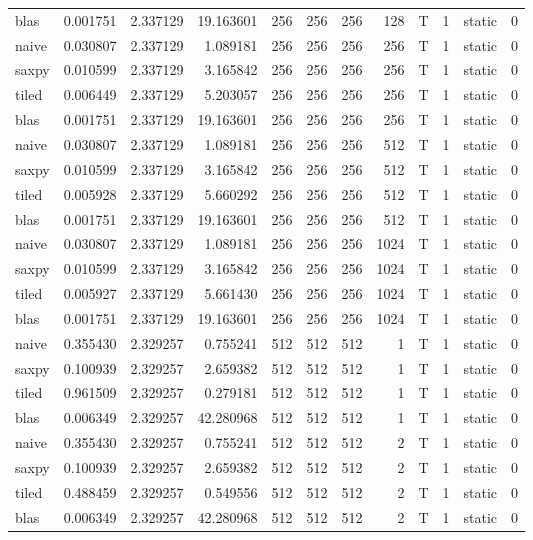 \documentclass[
  12pt,
  xcolor = usenames,dvipsnames]{article}
\begin{document}
\begin{table}[!h]
{\begin{tabular}[t]{lrrrrrrrlrlr}
blas & 0.001751 & 2.337129 & 19.163601 & 256 & 256 & 256 & 128 & T & 1 & static & 0\\
\addlinespace
naive & 0.030807 & 2.337129 & 1.089181 & 256 & 256 & 256 & 256 & T & 1 & static & 0\\
saxpy & 0.010599 & 2.337129 & 3.165842 & 256 & 256 & 256 & 256 & T & 1 & static & 0\\
tiled & 0.006449 & 2.337129 & 5.203057 & 256 & 256 & 256 & 256 & T & 1 & static & 0\\
blas & 0.001751 & 2.337129 & 19.163601 & 256 & 256 & 256 & 256 & T & 1 & static & 0\\
naive & 0.030807 & 2.337129 & 1.089181 & 256 & 256 & 256 & 512 & T & 1 & static & 0\\
\addlinespace
saxpy & 0.010599 & 2.337129 & 3.165842 & 256 & 256 & 256 & 512 & T & 1 & static & 0\\
tiled & 0.005928 & 2.337129 & 5.660292 & 256 & 256 & 256 & 512 & T & 1 & static & 0\\
blas & 0.001751 & 2.337129 & 19.163601 & 256 & 256 & 256 & 512 & T & 1 & static & 0\\
naive & 0.030807 & 2.337129 & 1.089181 & 256 & 256 & 256 & 1024 & T & 1 & static & 0\\
saxpy & 0.010599 & 2.337129 & 3.165842 & 256 & 256 & 256 & 1024 & T & 1 & static & 0\\
\addlinespace
tiled & 0.005927 & 2.337129 & 5.661430 & 256 & 256 & 256 & 1024 & T & 1 & static & 0\\
blas & 0.001751 & 2.337129 & 19.163601 & 256 & 256 & 256 & 1024 & T & 1 & static & 0\\
naive & 0.355430 & 2.329257 & 0.755241 & 512 & 512 & 512 & 1 & T & 1 & static & 0\\
saxpy & 0.100939 & 2.329257 & 2.659382 & 512 & 512 & 512 & 1 & T & 1 & static & 0\\
tiled & 0.961509 & 2.329257 & 0.279181 & 512 & 512 & 512 & 1 & T & 1 & static & 0\\
\addlinespace
blas & 0.006349 & 2.329257 & 42.280968 & 512 & 512 & 512 & 1 & T & 1 & static & 0\\
naive & 0.355430 & 2.329257 & 0.755241 & 512 & 512 & 512 & 2 & T & 1 & static & 0\\
saxpy & 0.100939 & 2.329257 & 2.659382 & 512 & 512 & 512 & 2 & T & 1 & static & 0\\
tiled & 0.488459 & 2.329257 & 0.549556 & 512 & 512 & 512 & 2 & T & 1 & static & 0\\
blas & 0.006349 & 2.329257 & 42.280968 & 512 & 512 & 512 & 2 & T & 1 & static & 0\\

\end{tabular}}
\end{table}
\end{document}
